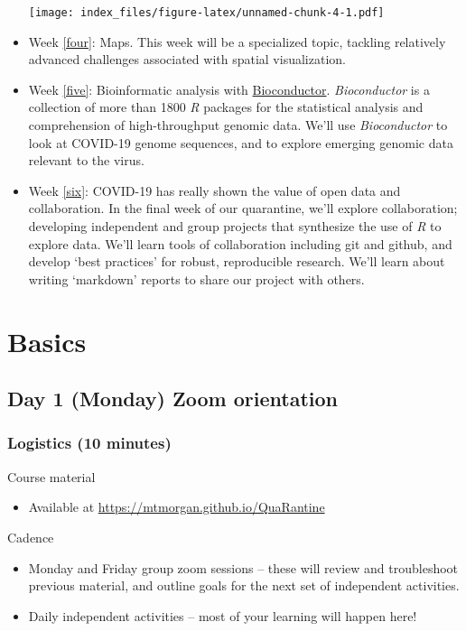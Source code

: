 \documentclass[]{book}
\providecommand{\tightlist}{%
  \setlength{\itemsep}{0pt}\setlength{\parskip}{0pt}}
\begin{document}
\begin{itemize}
  \texttt{[image: index\_files/figure-latex/unnamed-chunk-4-1.pdf]}
\item
  Week \ref{four}: Maps. This week will be a specialized topic, tackling relatively advanced challenges associated with spatial visualization.
\item
  Week \ref{five}: Bioinformatic analysis with \href{https://bioconductor.org}{Bioconductor}. \emph{Bioconductor} is a collection of more than 1800 \emph{R} packages for the statistical analysis and comprehension of high-throughput genomic data. We'll use \emph{Bioconductor} to look at COVID-19 genome sequences, and to explore emerging genomic data relevant to the virus.
\item
  Week \ref{six}: COVID-19 has really shown the value of open data and collaboration. In the final week of our quarantine, we'll explore collaboration; developing independent and group projects that synthesize the use of \emph{R} to explore data. We'll learn tools of collaboration including git and github, and develop `best practices' for robust, reproducible research. We'll learn about writing `markdown' reports to share our project with others.
\end{itemize}

\hypertarget{one}{%
\chapter{Basics}\label{one}}

\hypertarget{day-1-monday-zoom-orientation}{%
\section{Day 1 (Monday) Zoom orientation}\label{day-1-monday-zoom-orientation}}

\hypertarget{logistics-10-minutes}{%
\subsection{Logistics (10 minutes)}\label{logistics-10-minutes}}

Course material

\begin{itemize}
\tightlist
\item
  Available at \url{https://mtmorgan.github.io/QuaRantine}
\end{itemize}

Cadence

\begin{itemize}
\tightlist
\item
  Monday and Friday group zoom sessions -- these will review and troubleshoot previous material, and outline goals for the next set of independent activities.
\item
  Daily independent activities -- most of your learning will happen here!
\end{itemize}
\end{document}
